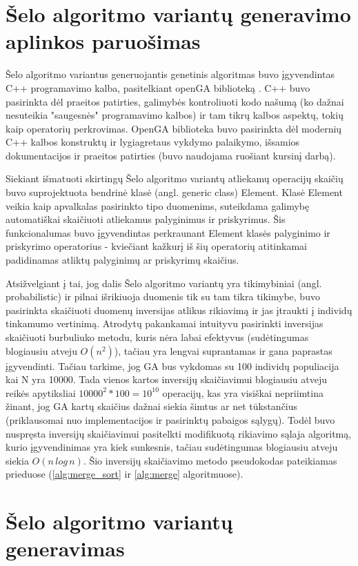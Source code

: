 \documentclass{VUMIFInfKursinis}
\begin{document}
\section{Šelo algoritmo variantų generavimo aplinkos paruošimas}

Šelo algoritmo variantus generuojantis genetinis algoritmas buvo įgyvendintas C++ programavimo kalba, pasitelkiant openGA biblioteką \cite{mohammadi2017openga}.
C++ buvo pasirinkta dėl praeitos patirties, galimybės kontroliuoti kodo našumą (ko dažnai nesuteikia "saugesnės" programavimo kalbos)
ir tam tikrų kalbos aspektų, tokių kaip operatorių perkrovimas.
OpenGA biblioteka buvo pasirinkta dėl modernių C++ kalbos konstruktų ir lygiagretaus vykdymo palaikymo, išsamios dokumentacijos ir praeitos patirties (buvo naudojama ruošiant kursinį darbą).

Siekiant išmatuoti skirtingų Šelo algoritmo variantų atliekamų operacijų skaičių buvo
suprojektuota bendrinė klasė (angl. generic class) Element.
Klasė Element veikia kaip apvalkalas pasirinkto tipo duomenims, suteikdama
galimybę automatiškai skaičiuoti atliekamus palyginimus ir priskyrimus.
Šis funkcionalumas buvo įgyvendintas perkraunant Element klasės palyginimo ir priskyrimo operatorius - kviečiant
kažkurį iš šių operatorių atitinkamai padidinamas atliktų palyginimų ar priskyrimų skaičius.

Atsižvelgiant į tai, jog dalis Šelo algoritmo variantų yra tikimybiniai (angl. probabilistic) ir pilnai išrikiuoja duomenis tik su tam tikra tikimybe,
buvo pasirinkta skaičiuoti duomenų inversijas atlikus rikiavimą ir jas įtraukti į individų tinkamumo vertinimą.
Atrodytų pakankamai intuityvu pasirinkti inversijas skaičiuoti burbuliuko metodu, kuris nėra labai efektyvus (sudėtingumas blogiausiu atveju $O(n^2)$),
tačiau yra lengvai suprantamas ir gana paprastas įgyvendinti.
Tačiau tarkime, jog GA bus vykdomas su 100 individų populiacija kai N yra 10000.
Tada vienos kartos inversijų skaičiavimui blogiausiu atveju reikės apytiksliai $10000^2 * 100 = 10^{10}$ operacijų, kas yra visiškai nepriimtina žinant,
jog GA kartų skaičius dažnai siekia šimtus ar net tūkstančius (priklausomai nuo implementacijos ir pasirinktų pabaigos sąlygų).
Todėl buvo nuspręsta inversijų skaičiavimui pasitelkti modifikuotą rikiavimo sąlaja algoritmą, kurio įgyvendinimas yra kiek sunkesnis, tačiau sudėtingumas blogiausiu atveju siekia $O(n\,log\,n)$.
Šio inversijų skaičiavimo metodo pseudokodas pateikiamas prieduose (\ref{alg:merge_sort} ir \ref{alg:merge} algoritmuose).

\section{Šelo algoritmo variantų generavimas}
\end{document}
